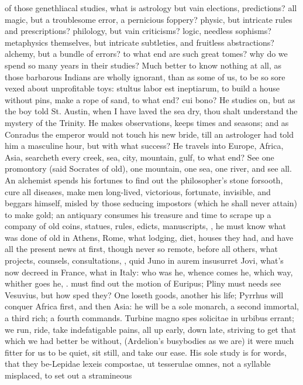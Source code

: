 {of those genethliacal studies, what is astrology but vain elections,
predictions? all magic, but a troublesome error, a pernicious foppery?
physic, but intricate rules and prescriptions? philology, but vain
criticisms? logic, needless sophisms? metaphysics themselves, but
intricate subtleties, and fruitless abstractions? alchemy, but a bundle
of errors? to what end are such great tomes? why do we spend so many
years in their studies? Much better to know nothing at all, as those
barbarous Indians are wholly ignorant, than as some of us, to be so
sore vexed about unprofitable toys: stultus labor est ineptiarum, to
build a house without pins, make a rope of sand, to what end? cui bono?
He studies on, but as the boy told St. Austin, when I have laved the
sea dry, thou shalt understand the mystery of the Trinity. He makes
observations, keeps times and seasons; and as Conradus the
emperor would not touch his new bride, till an astrologer had told him
a masculine hour, but with what success? He travels into Europe,
Africa, Asia, searcheth every creek, sea, city, mountain, gulf, to what
end? See one promontory (said Socrates of old), one mountain, one sea,
one river, and see all. An alchemist spends his fortunes to find out
the philosopher's stone forsooth, cure all diseases, make men
long-lived, victorious, fortunate, invisible, and beggars himself,
misled by those seducing impostors (which he shall never attain) to
make gold; an antiquary consumes his treasure and time to scrape up a
company of old coins, statues, rules, edicts, manuscripts, \etc{}, he must
know what was done of old in Athens, Rome, what lodging, diet, houses
they had, and have all the present news at first, though never so
remote, before all others, what projects, counsels, consultations, \etc{},
quid Juno in aurem insusurret Jovi, what's now decreed in France, what
in Italy: who was he, whence comes he, which way, whither goes he, \etc{}.
\Aristotle must find out the motion of Euripus; Pliny must needs see
Vesuvius, but how sped they? One loseth goods, another his life;
Pyrrhus will conquer Africa first, and then Asia: he will be a sole
monarch, a second immortal, a third rich; a fourth commands. 
Turbine magno spes solicitae in urbibus errant; we run, ride, take
indefatigable pains, all up early, down late, striving to get that
which we had better be without, (Ardelion's busybodies as we are) it
were much fitter for us to be quiet, sit still, and take our ease. His
sole study is for words, that they be-Lepidae lexeis compostae, ut
tesserulae omnes, not a syllable misplaced, to set out a stramineous
}
